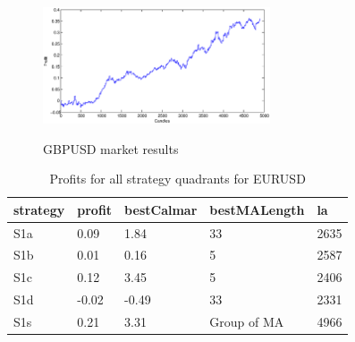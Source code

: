\documentclass{tewiart}
\begin{document}
\begin{figure}[h]
\begin{minipage}{.49\linewidth}
\label{mansard}
\end{minipage}
\begin{minipage}{\linewidth}
\centering 
\includegraphics[width=0.6\textwidth]{images/S1s_gbpusd.eps}
\label{mansard}
\end{minipage}
\caption{GBPUSD market results}
\end{figure}
\FloatBarrier

\newpage
\begin{table}[!t]
\caption{Profits for all strategy quadrants for EURUSD} 
 \begin{center} 
 \begin{tabular}{|l|l|l|l|l|} 
 \hline \textbf{strategy} & \textbf{profit} & \textbf{bestCalmar} & \textbf{bestMALength} & \textbf{la} \\ \hline  
S1a & 0.09 & 1.84 & 33 & 2635\\ \hline 
S1b & 0.01 & 0.16 & 5 & 2587\\ \hline 
S1c & 0.12 & 3.45 & 5 & 2406\\ \hline 
S1d & -0.02 & -0.49 & 33 & 2331\\ \hline 
S1s & 0.21 & 3.31 & Group of MA & 4966\\ 
\hline \end{tabular} 
 \end{center} 
 \end{table}
\FloatBarrier
\end{document}
